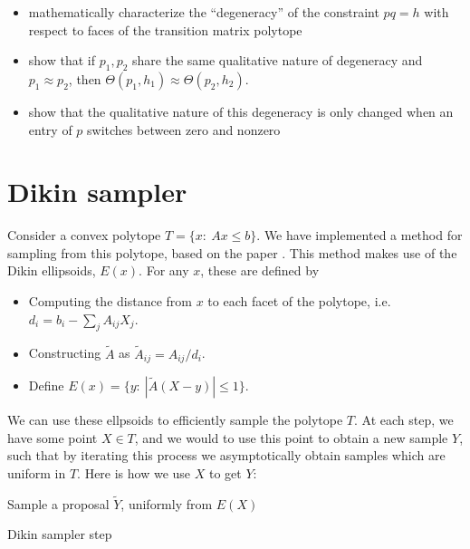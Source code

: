 \begin{itemize}
    \item mathematically characterize the ``degeneracy'' of the constraint $pq=h$ with respect to faces of the transition matrix polytope
    \item show that if $p_1,p_2$ share the same qualitative nature of degeneracy and $p_1\approx p_2$, then $\Theta(p_1,h_1)\approx\Theta(p_2,h_2)$.
    \item show that the qualitative nature of this degeneracy is only changed when an entry of $p$ switches between zero and nonzero
\end{itemize}




\appendix

\section{Dikin sampler}

\label{sec:dikin}

Consider a convex polytope $T=\{x:\ Ax\leq b\}$.  We have implemented a method for sampling from this polytope, based on the paper \citep{kannan2012random}.  This method makes use of the Dikin ellipsoids, $E(x)$.  For any $x$, these are defined by 

\begin{itemize}
    \item Computing the distance from $x$ to each facet of the polytope, i.e. $d_i = b_i - \sum_j A_{ij} X_j$.
    \item Constructing $\tilde A$ as $\tilde A_{ij} = A_{ij} / d_i$.
    \item Define $E(x) = \{y:\ |\tilde A (X-y)|\leq 1\}$.  
\end{itemize}

We can use these ellpsoids to efficiently sample the polytope $T$.    At each step, we have some point $X\in T$, and we would to use this point to obtain a new sample $Y$, such that by iterating this process we asymptotically obtain samples which are uniform in $T$.  Here is how we use $X$ to get $Y$:

\begin{algorithm}[H]
 \vspace{.1in}
  Sample a proposal $\tilde Y$, uniformly from $E(X)$\;
 \caption{Dikin sampler step}
\end{algorithm}

